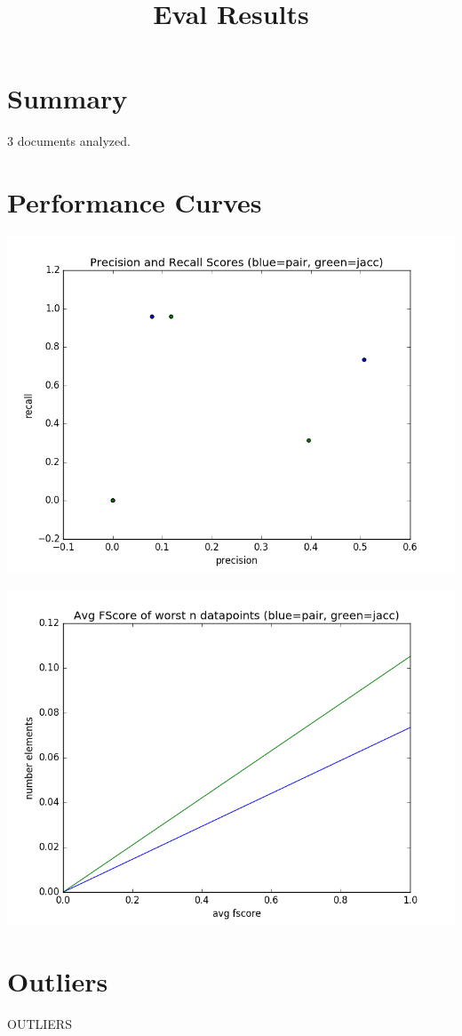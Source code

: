 \documentclass{article}
\title{Eval Results}
\date{}
\begin{document}
\maketitle

\setcounter{section}{-1}
\section{Summary}
3 documents analyzed.
\section{Performance Curves}
\includegraphics[width=15cm]{TEST.png}

    \includegraphics[width=15cm]{TEST2.png}
\section{Outliers}
OUTLIERS
\end{document}
